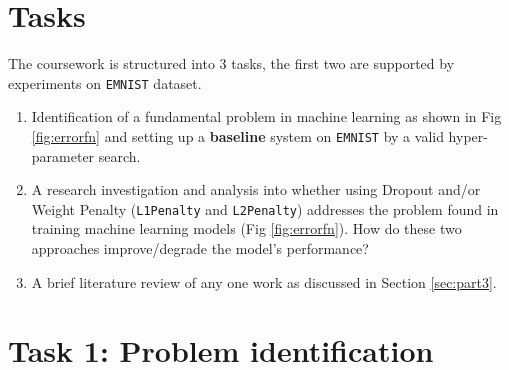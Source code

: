 \documentclass[11pt,]{article}
\begin{document}
\section{Tasks}
\label{sec:tasks}
The coursework is structured into 3 tasks, the first two are supported by experiments on \texttt{EMNIST} dataset. 
\begin{enumerate}
    \item Identification of a fundamental problem in machine learning as shown in Fig \ref{fig:errorfn} and setting up a \textbf{baseline} system on \texttt{EMNIST} by a valid hyper-parameter search. 
   
    \item A research investigation and analysis into whether using Dropout and/or Weight Penalty (\texttt{L1Penalty} and \texttt{L2Penalty}) addresses the problem found in training machine learning models (Fig \ref{fig:errorfn}). How do these two approaches improve/degrade the model's performance?
    \item{A brief literature review of any one work as discussed in Section \ref{sec:part3}.}
\end{enumerate}



\section{Task 1: Problem identification}
\label{sec:baseline}
\end{document}
